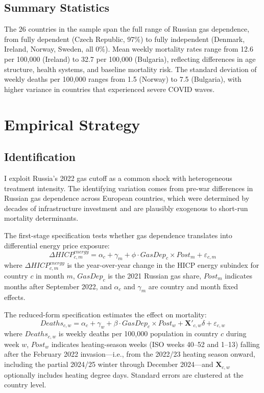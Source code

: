 \documentclass[12pt]{article}
\begin{document}
\subsection{Summary Statistics}



The 26 countries in the sample span the full range of Russian gas dependence, from fully dependent (Czech Republic, 97\%) to fully independent (Denmark, Ireland, Norway, Sweden, all 0\%). Mean weekly mortality rates range from 12.6 per 100,000 (Ireland) to 32.7 per 100,000 (Bulgaria), reflecting differences in age structure, health systems, and baseline mortality risk. The standard deviation of weekly deaths per 100,000 ranges from 1.5 (Norway) to 7.5 (Bulgaria), with higher variance in countries that experienced severe COVID waves.


\section{Empirical Strategy}
\label{sec:strategy}

\subsection{Identification}

I exploit Russia's 2022 gas cutoff as a common shock with heterogeneous treatment intensity. The identifying variation comes from pre-war differences in Russian gas dependence across European countries, which were determined by decades of infrastructure investment and are plausibly exogenous to short-run mortality determinants.

The first-stage specification tests whether gas dependence translates into differential energy price exposure:
\begin{equation}
\Delta HICP_{c,m}^{energy} = \alpha_c + \gamma_m + \phi \cdot GasDep_c \times Post_m + \varepsilon_{c,m}
\label{eq:first_stage}
\end{equation}
where $\Delta HICP_{c,m}^{energy}$ is the year-over-year change in the HICP energy subindex for country $c$ in month $m$, $GasDep_c$ is the 2021 Russian gas share, $Post_m$ indicates months after September 2022, and $\alpha_c$ and $\gamma_m$ are country and month fixed effects.

The reduced-form specification estimates the effect on mortality:
\begin{equation}
Deaths_{c,w} = \alpha_c + \gamma_w + \beta \cdot GasDep_c \times Post_w + \mathbf{X}'_{c,w} \delta + \varepsilon_{c,w}
\label{eq:main}
\end{equation}
where $Deaths_{c,w}$ is weekly deaths per 100,000 population in country $c$ during week $w$, $Post_w$ indicates heating-season weeks (ISO weeks 40--52 and 1--13) falling after the February 2022 invasion---i.e., from the 2022/23 heating season onward, including the partial 2024/25 winter through December 2024---and $\mathbf{X}_{c,w}$ optionally includes heating degree days. Standard errors are clustered at the country level.
\end{document}

